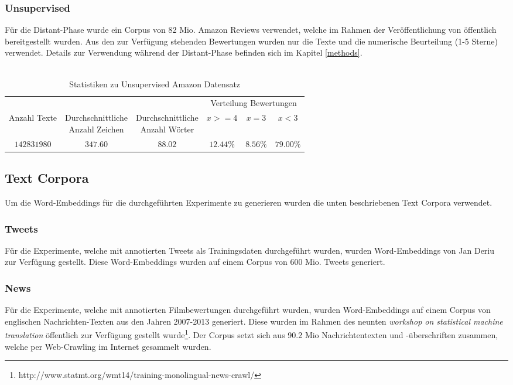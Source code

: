 \subsubsection{Unsupervised}
Für die Distant-Phase wurde ein Corpus von 82 Mio. Amazon Reviews verwendet, welche im Rahmen der Veröffentlichung von \cite{zhang2015character} öffentlich bereitgestellt wurden. Aus den zur Verfügung stehenden Bewertungen wurden nur die Texte und die numerische Beurteilung (1-5 Sterne) verwendet. Details zur Verwendung während der Distant-Phase befinden sich im Kapitel \ref{methods}.\\\\
\begin{table}[h]
	\centering
	\begin{adjustbox}{max width=\textwidth}
		\begin{tabular}{@{}cccccc@{}}
			\toprule
			& & & \multicolumn{3}{c}{Verteilung Bewertungen}\\
			\cmidrule(r){4-6}
			Anzahl Texte & \specialcell{Durchschnittliche\\Anzahl Zeichen} & \specialcell{Durchschnittliche\\Anzahl Wörter} & $x >= 4$ & $x = 3$ & $x < 3$\\ \midrule
			$142831980$ & $347.60$ & $88.02$ & $12.44\%$ & $8.56\%$ & $79.00\%$\\
			\bottomrule
		\end{tabular}
	\end{adjustbox}
	\caption{Statistiken zu Unsupervised Amazon Datensatz}
\end{table}
\subsection{Text Corpora}
Um die Word-Embeddings für die durchgeführten Experimente zu generieren wurden die unten beschriebenen Text Corpora verwendet.

\subsubsection{Tweets}
Für die Experimente, welche mit annotierten Tweets als Trainingsdaten durchgeführt wurden, wurden Word-Embeddings von Jan Deriu zur Verfügung gestellt. Diese Word-Embeddings wurden auf einem Corpus von 600 Mio. Tweets generiert.

\subsubsection{News}
Für die Experimente, welche mit annotierten Filmbewertungen durchgeführt wurden, wurden Word-Embeddings auf einem Corpus von englischen Nachrichten-Texten aus den Jahren 2007-2013 generiert. Diese wurden im Rahmen des neunten \emph{workshop on statistical machine translation} öffentlich zur Verfügung gestellt wurde\footnote{http://www.statmt.org/wmt14/training-monolingual-news-crawl/}. Der Corpus setzt sich aus 90.2 Mio Nachrichtentexten und -überschriften zusammen, welche per Web-Crawling im Internet gesammelt wurden. 